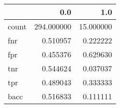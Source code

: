 \begin{tabular}{lrr}
\toprule
{} &         0.0 &        1.0 \\
\midrule
count &  294.000000 &  15.000000 \\
fnr   &    0.510957 &   0.222222 \\
fpr   &    0.455376 &   0.629630 \\
tnr   &    0.544624 &   0.037037 \\
tpr   &    0.489043 &   0.333333 \\
bacc  &    0.516833 &   0.111111 \\
\bottomrule
\end{tabular}
